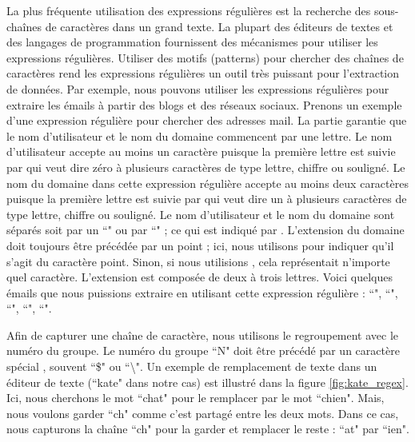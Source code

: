 \documentclass{KodeBook}
\begin{document}
La plus fréquente utilisation des expressions régulières est la recherche des sous-chaînes de caractères dans un grand texte.
La plupart des éditeurs de textes et des langages de programmation fournissent des mécanismes pour utiliser les expressions régulières.
Utiliser des motifs (patterns) pour chercher des chaînes de caractères rend les expressions régulières un outil très puissant pour l'extraction de données.
Par exemple, nous pouvons utiliser les expressions régulières pour extraire les émails à partir des blogs et des réseaux sociaux.
Prenons un exemple d'une expression régulière  pour chercher des adresses mail.
La partie \expword{/[a-zA-Z]/} garantie que le nom d'utilisateur et le nom du domaine commencent par une lettre.
Le nom d'utilisateur accepte au moins un caractère puisque la première lettre est suivie par  qui veut dire zéro à plusieurs caractères de type lettre, chiffre ou souligné.
Le nom du domaine dans cette expression régulière accepte au moins deux caractères puisque la première lettre est suivie par  qui veut dire un à plusieurs caractères de type lettre, chiffre ou souligné.
Le nom d'utilisateur et le nom du domaine sont séparés soit par un ``" ou par ``" ; ce qui est indiqué par .
L'extension du domaine doit toujours être précédée par un point ; ici, nous utilisons  pour indiquer qu'il s'agit du caractère point.
Sinon, si nous utilisions , cela représentait n'importe quel caractère.
L'extension est composée de deux à trois lettres.
Voici quelques émails que nous puissions extraire en utilisant cette expression régulière : 
``", ``", ``", ``", ``".


Afin de capturer une chaîne de caractère, nous utilisons le regroupement avec le numéro du groupe.
Le numéro du groupe ``N" doit être précédé par un caractère spécial , souvent ``\$" ou ``\textbackslash".
Un exemple de remplacement de texte dans un éditeur de texte (``kate" dans notre cas) est illustré dans la figure \ref{fig:kate_regex}.
Ici, nous cherchons le mot ``chat" pour le remplacer par le mot ``chien". 
Mais, nous voulons garder ``ch" comme c'est partagé entre les deux mots.
Dans ce cas, nous capturons la chaîne ``ch" pour la garder et remplacer le reste : ``at" par ``ien".
\end{document}
